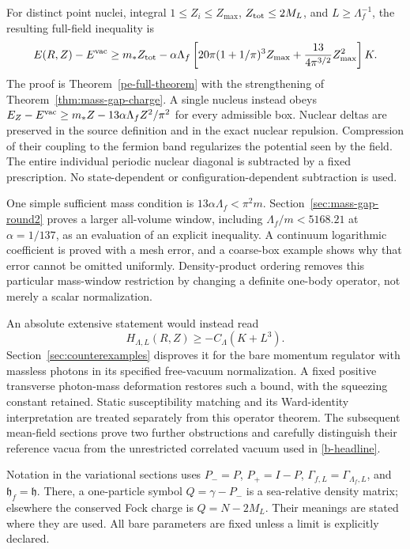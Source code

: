 For distinct point nuclei, integral $1\le Z_i\le Z_{\max}$,
$Z_{\rm tot}\le2M_L$, and $L\ge\Lambda_f^{-1}$, the resulting
full-field inequality is
\begin{equation}
 E(R,Z)-E^{\mathrm{vac}}\ge m_*Z_{\rm tot}
 -\alpha\Lambda_f\left[
 20\pi(1+1/\pi)^3Z_{\max}
 +\frac{13}{4\pi^{3/2}}Z_{\max}^2\right]K.
 \label{b-headline}
\end{equation}
The proof is Theorem~\ref{pe-full-theorem} with the strengthening
of Theorem~\ref{thm:mass-gap-charge}. A single nucleus instead obeys
$E_Z-E^{\mathrm{vac}}\ge m_*Z-13\alpha\Lambda_fZ^2/\pi^2$ for every
admissible box. Nuclear deltas are preserved in the source definition
and in the exact nuclear repulsion. Compression of their coupling
to the fermion band regularizes the potential seen by the field.
The entire individual periodic nuclear diagonal is subtracted by a
fixed prescription. No state-dependent or configuration-dependent
subtraction is used.

One simple sufficient mass condition is
$13\alpha\Lambda_f<\pi^2m$. Section~\ref{sec:mass-gap-round2}
proves a larger all-volume window, including
$\Lambda_f/m<5168.21$ at $\alpha=1/137$, as an evaluation of an
explicit inequality. A continuum logarithmic coefficient is proved
with a mesh error, and a coarse-box example shows why that error
cannot be omitted uniformly. Density-product ordering removes this
particular mass-window restriction by changing a definite one-body
operator, not merely a scalar normalization.

An absolute extensive statement would instead read
\begin{equation}
 H_{\Lambda,L}(R,Z)\ge-C_\Lambda(K+L^3).
 \tag{W}\label{eq:W}
\end{equation}
Section~\ref{sec:counterexamples} disproves it for the bare momentum
regulator with massless photons in its specified free-vacuum normalization. A
fixed positive transverse photon-mass deformation restores such a
bound, with the squeezing constant retained. Static susceptibility
matching and its Ward-identity interpretation are treated separately
from this operator theorem. The subsequent mean-field sections prove
two further obstructions and carefully distinguish their reference
vacua from the unrestricted correlated vacuum used in
\eqref{b-headline}.

Notation in the variational sections uses $P_-=P$, $P_+=I-P$,
$\Gamma_{f,L}=\Gamma_{\Lambda_f,L}$, and $\mathfrak h_f=\mathfrak h$.
There, a one-particle symbol $Q=\gamma-P_-$ is a sea-relative density
matrix; elsewhere the conserved Fock charge is $Q=N-2M_L$.
Their meanings are stated where they are used. All bare parameters
are fixed unless a limit is explicitly declared.
